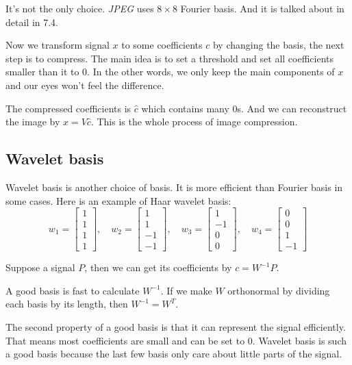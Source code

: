 \documentclass[10pt,a4paper,oneside,numbers=noenddot]{scrbook}
\theoremstyle{ctplain}
\theoremstyle{ctresult}
\begin{document}
It's not the only choice. \emph{JPEG} uses $8 \times 8$ Fourier basis. And it is talked
about in detail in 7.4.

Now we transform signal $x$ to some coefficients $c$ by changing the basis, the next step
is to compress. The main idea is to set a threshold and set all coefficients smaller than it
to 0. In the other words, we only keep the main components of $x$ and our eyes won't feel
the difference.

The compressed coefficients is $\hat{c}$ which contains many 0s. And we can reconstruct
the image by $\hat{x} = V\hat{c}$. This is the whole process of image compression.

\subsection{Wavelet basis}

Wavelet basis is another choice of basis. It is more efficient than Fourier basis in
some cases. Here is an example of Haar wavelet basis:
\[
  w_1 = \begin{bmatrix}
    1 \\ 1 \\ 1 \\ 1
  \end{bmatrix}, \quad
  w_2 = \begin{bmatrix}
    1 \\ 1 \\ -1 \\ -1
  \end{bmatrix}, \quad
  w_3 = \begin{bmatrix}
    1 \\ -1 \\ 0 \\ 0
  \end{bmatrix}, \quad
  w_4 = \begin{bmatrix}
    0 \\ 0 \\ 1 \\ -1
  \end{bmatrix}
\]

Suppose a signal $P$, then we can get its coefficients by $c = W^{-1}P$.

A good basis is fast to calculate $W^{-1}$. If we make $W$ orthonormal by dividing each
basis by its length, then $W^{-1} = W^{T}$.

The second property of a good basis is that it can represent the signal efficiently. That means
most coefficients are small and can be set to 0. Wavelet basis is such a good basis because
the last few basis only care about little parts of the signal.
\end{document}
